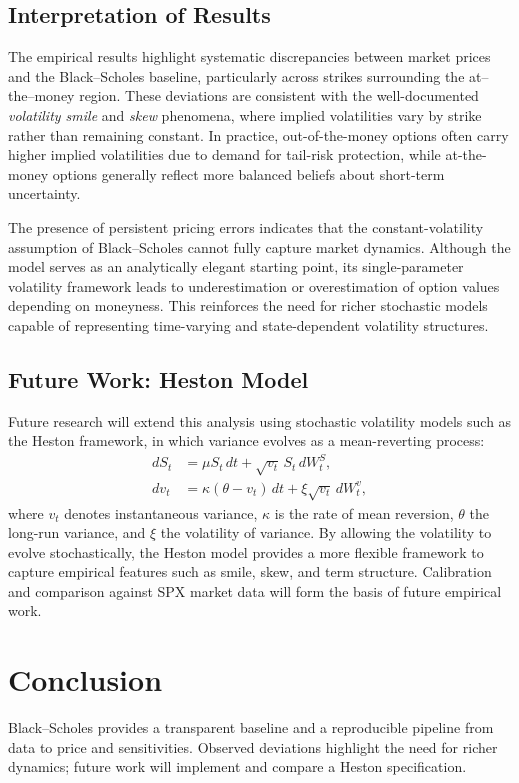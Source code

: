 \documentclass[12pt]{article}
\begin{document}
\subsection{Interpretation of Results}
The empirical results highlight systematic discrepancies between market prices and the Black--Scholes baseline, particularly across strikes surrounding the at--the--money region. These deviations are consistent with the well-documented \emph{volatility smile} and \emph{skew} phenomena, where implied volatilities vary by strike rather than remaining constant. In practice, out-of-the-money options often carry higher implied volatilities due to demand for tail-risk protection, while at-the-money options generally reflect more balanced beliefs about short-term uncertainty.

The presence of persistent pricing errors indicates that the constant-volatility assumption of Black--Scholes cannot fully capture market dynamics. Although the model serves as an analytically elegant starting point, its single-parameter volatility framework leads to underestimation or overestimation of option values depending on moneyness. This reinforces the need for richer stochastic models capable of representing time-varying and state-dependent volatility structures.

\subsection{Future Work: Heston Model}
Future research will extend this analysis using stochastic volatility models such as the Heston framework, in which variance evolves as a mean-reverting process:
\begin{equation}
\begin{aligned}
dS_t &= \mu S_t\,dt + \sqrt{v_t}\, S_t\, dW_t^S, \\
dv_t &= \kappa(\theta - v_t)\,dt + \xi \sqrt{v_t}\, dW_t^v,
\end{aligned}
\end{equation}
where $v_t$ denotes instantaneous variance, $\kappa$ is the rate of mean reversion, $\theta$ the long-run variance, and $\xi$ the volatility of variance. By allowing the volatility to evolve stochastically, the Heston model provides a more flexible framework to capture empirical features such as smile, skew, and term structure. Calibration and comparison against SPX market data will form the basis of future empirical work.


\section{Conclusion}
Black--Scholes provides a transparent baseline and a reproducible pipeline from data to price and sensitivities.
Observed deviations highlight the need for richer dynamics; future work will implement and compare a Heston specification.



\end{document}
